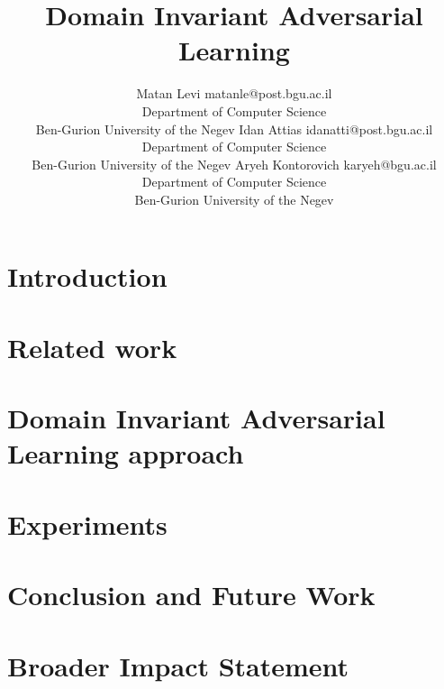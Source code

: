 \documentclass[10pt]{article} %
\title{Domain Invariant Adversarial Learning}
\author{\name Matan Levi \email matanle@post.bgu.ac.il \\
      \addr Department of Computer Science\\
      Ben-Gurion University of the Negev
      \AND
      \name Idan Attias \email idanatti@post.bgu.ac.il \\
      \addr Department of Computer Science \\
      Ben-Gurion University of the Negev
      \AND
      \name Aryeh Kontorovich \email karyeh@bgu.ac.il\\
      \addr Department of Computer Science \\
      Ben-Gurion University of the Negev
      }
\begin{document}
\maketitle

\begin{abstract}

\end{abstract}

\section{Introduction}



\section{Related work}
%



\section{Domain Invariant Adversarial Learning approach}



\section{Experiments} \label{experiments}



\section{Conclusion and Future Work}


\section{Broader Impact Statement}





\appendix

\end{document}
